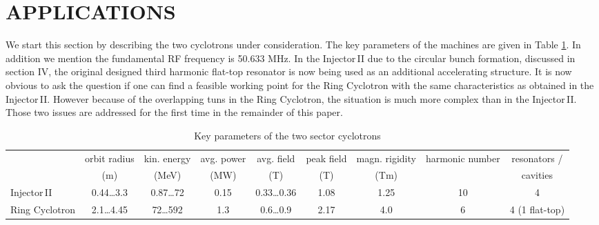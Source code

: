 \documentclass[aps,prstab,onecolumn,superscriptaddress,showpacs]{revtex4}
\begin{document}



\section{APPLICATIONS}
We start this section by describing the two cyclotrons under consideration. The key parameters of the machines are given in Table \ref{tab:cycs}. 
In addition we mention the fundamental RF frequency is 50.633 MHz.
In the Injector\,II due to the circular bunch formation, discussed in section IV, the original designed third harmonic flat-top resonator is now being used as an additional 
accelerating structure.
It is now obvious to ask the question if one can find a feasible working point for the Ring Cyclotron with the same characteristics as obtained in the Injector\,II. However because of
the overlapping tuns in the Ring Cyclotron, the situation is much more complex than in the Injector\,II. Those two issues are addressed for the first time in the remainder of this paper. 
\begin{table}
\caption{\label{tab:cycs} Key parameters of the two sector cyclotrons}
\begin{tabular}{lcccccccc}
\hline \hline
& orbit radius & kin. energy &  avg. power & avg. field & peak field & magn. rigidity & harmonic number & resonators / \\
& (m) & (MeV) & (MW) & (T)& (T) & (Tm) & & cavities\\
\hline
Injector\,II & 0.44\dots3.3 & 0.87\dots72 & 0.15 & 0.33\dots0.36 & 1.08 & 1.25 & 10 & 4  \\
Ring Cyclotron & 2.1\dots4.45 & 72\dots592 & 1.3 & 0.6\dots0.9 & 2.17 & 4.0 & 6& 4 (1 flat-top)\\
\hline \hline
\end{tabular}
\end{table}
\end{document}
